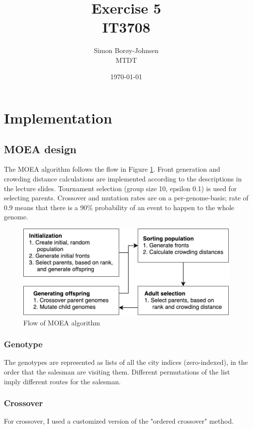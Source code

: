 \documentclass[
]{article}
\begin{document}
\title{\textbf{Exercise 5} \\ IT3708}
\author{Simon Borøy-Johnsen \\ MTDT}
\date{\today}
\maketitle


\section{Implementation}
\subsection{MOEA design}
The MOEA algorithm follows the flow in Figure \ref{fig:overview}. Front generation and crowding distance calculations are implemented according to the descriptions in the lecture slides. Tournament selection (group size 10, epsilon 0.1) is used for selecting parents. Crossover and mutation rates are on a per-genome-basis; rate of 0.9 means that there is a 90\% probability of an event to happen to the whole genome.

\begin{figure}
    \centering
    \includegraphics[scale=0.7]{overview.pdf}
    \caption{Flow of MOEA algorithm}
    \label{fig:overview}
\end{figure}

\subsubsection{Genotype}
The genotypes are represented as lists of all the city indices (zero-indexed), in the order that the salesman are visiting them. Different permutations of the list imply different routes for the salesman.

\subsubsection{Crossover}
For crossover, I used a customized version of the "ordered crossover" method.
\end{document}
